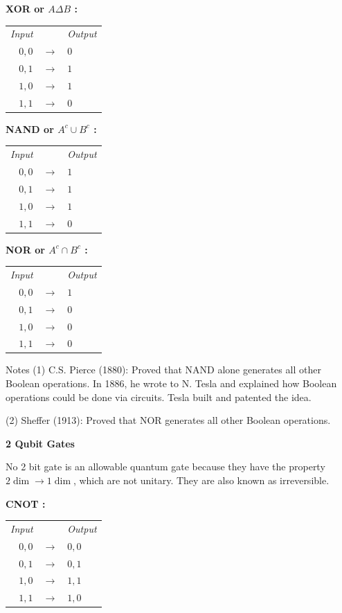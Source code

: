 \documentclass[12pt]{article}
\theoremstyle{definition}
\begin{document}
\textbf{XOR or $A\Delta B$ :}
\begin{center}
\begin{tabular}{rcl}
\textit{Input} & & \textit{Output} \\
$0,0$ & $\to$ & $0$ \\
$0,1$ & $\to$ & $1$ \\
$1,0$ & $\to$ & $1$ \\
$1,1$ & $\to$ & $0$
\end{tabular}
\end{center}

\textbf{NAND or $A^c \cup B^c$ :}
\begin{center}
\begin{tabular}{rcl}
\textit{Input} & & \textit{Output} \\
$0,0$ & $\to$ & $1$ \\
$0,1$ & $\to$ & $1$ \\
$1,0$ & $\to$ & $1$ \\
$1,1$ & $\to$ & $0$
\end{tabular}
\end{center}

\textbf{NOR or $A^c \cap B^c$ :}
\begin{center}
\begin{tabular}{rcl}
\textit{Input} & & \textit{Output} \\
$0,0$ & $\to$ & $1$ \\
$0,1$ & $\to$ & $0$ \\
$1,0$ & $\to$ & $0$ \\
$1,1$ & $\to$ & $0$
\end{tabular}
\end{center}

Notes (1) C.S. Pierce (1880): Proved that NAND alone generates all other Boolean operations. In 1886, he wrote to N. Tesla and explained how Boolean operations could be done via circuits. Tesla built and patented the idea.

(2) Sheffer (1913): Proved that NOR generates all other Boolean operations.

\begin{center}
\textbf{2 Qubit Gates}
\end{center}

No 2 bit gate is an allowable quantum gate because they have the property $2\dim \to 1\dim$, which are not unitary. They are also known as irreversible.

\textbf{CNOT :}
\begin{center}
\begin{tabular}{rcl}
\textit{Input} & & \textit{Output} \\
$0,0$ & $\to$ & $0,0$ \\
$0,1$ & $\to$ & $0,1$ \\
$1,0$ & $\to$ & $1,1$ \\
$1,1$ & $\to$ & $1,0$
\end{tabular}
\end{center}
\end{document}
